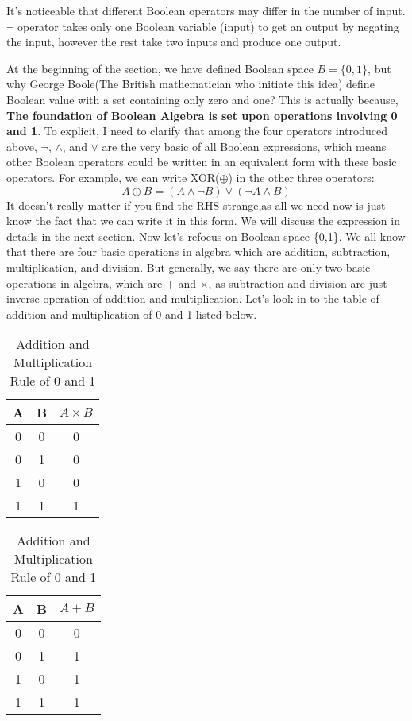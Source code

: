         It's noticeable that different Boolean operators may differ in the number of input. $\lnot$ operator
        takes only one Boolean variable (input) to get an output by negating the input, however the rest 
        take two inputs and produce one output. 
        
        At the beginning of the section, we have defined Boolean
        space $B=\{0,1\}$, but why George Boole(The British mathematician who initiate this idea) define 
        Boolean value with a set containing only zero and one? This is actually because, \textbf{The foundation
        of Boolean Algebra is set upon operations involving 0 and 1}. To explicit, I need to clarify that
        among the four operators introduced above, $\lnot$, $\land$, and $\lor$ are the very basic of all
        Boolean expressions, which means other Boolean operators could be written in an equivalent form with
        these basic operators. For example, we can write XOR($\oplus$) in the other three operators:
        \begin{equation}
            \label{xor}
            A \oplus B= (A \land \lnot B) \lor(\lnot A \land B)
        \end{equation}
        It doesn't really matter if you find the RHS strange,as all we need now is just know the fact 
        that we can write it in this form. We will discuss the expression in details in the next section.
        Now let's refocus on Boolean space \{0,1\}. We all know that there are four basic operations in 
        algebra which are addition, subtraction, multiplication, and division. But generally, we say there 
        are only two basic operations in algebra, which are $+$ and $\times$, as subtraction and division are
        just inverse operation of addition and multiplication. Let's look in to the table of addition and 
        multiplication of 0 and 1 listed below.
        \begin{table}[ht]
            \centering %
            \noindent
            \begin{tabular}{cc|c}
                A & B & $A \times B$ \\
                \hline
                0 & 0 & 0 \\
                0 & 1 & 0 \\
                1 & 0 & 0 \\
                1 & 1 & 1 \\
            \end{tabular}
            \quad
            \begin{tabular}{cc|c}
                A & B & $A + B$ \\
                \hline
                0 & 0 & 0 \\
                0 & 1 & 1 \\
                1 & 0 & 1 \\
                1 & 1 & 1 \\     
            \end{tabular}
        \caption{Addition and Multiplication Rule of 0 and 1}
        \end{table}

